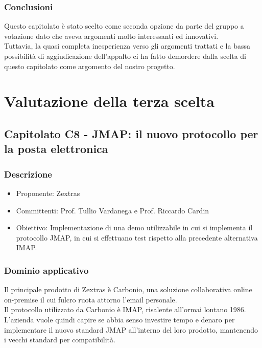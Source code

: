 \documentclass[a4paper, 11pt]{article}
\begin{document}
\subsubsection{Conclusioni}
Questo capitolato è stato scelto come seconda opzione da parte del gruppo a votazione dato che aveva argomenti molto interessanti ed innovativi. \\
Tuttavia, la quasi completa inesperienza verso gli argomenti trattati e la bassa possibilità di aggiudicazione dell'appalto ci ha fatto demordere dalla scelta di questo capitolato come argomento del nostro progetto.

\pagebreak

\section{Valutazione della terza scelta}
\subsection{Capitolato C8 - JMAP: il nuovo protocollo per la posta elettronica}
\subsubsection{Descrizione}
\begin{itemize}
    \item Proponente: Zextras 
    \item Committenti: Prof. Tullio Vardanega e Prof. Riccardo Cardin 
    \item Obiettivo: Implementazione di una demo utilizzabile in cui si implementa il protocollo JMAP, in cui si effettuano test rispetto alla precedente alternativa IMAP.
\end{itemize}
\subsubsection{Dominio applicativo}

Il principale prodotto di Zextras è Carbonio, una soluzione collaborativa online on-premise il cui fulcro ruota attorno l'email personale. \\
Il protocollo utilizzato da Carbonio è IMAP, risalente all'ormai lontano 1986. \\
L'azienda vuole quindi capire se abbia senso investire tempo e denaro per implementare il nuovo standard JMAP all'interno del loro prodotto, mantenendo i vecchi standard per compatibilità.
\end{document}
